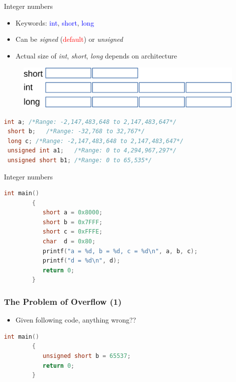 \begin{frame}[fragile]{Integer numbers}
	\vspace{-0.2in}
	\begin{itemize}
		\item Keywords: \textcolor{blue}{int}, \textcolor{blue}{short}, \textcolor{blue}{long}
		\item Can be \textit{signed} (\textcolor{red}{default}) or \textit{unsigned}
		\item Actual size of \textit{int}, \textit{short}, \textit{long} depends on architecture
	\end{itemize}
	\begin{figure}
		\includegraphics[width=0.65\linewidth]{figs/ints.pdf}
	\end{figure}
	\vspace{-0.1in}
	\begin{center}
	\begin{lstlisting}[language=c,frame=none, linewidth=0.9\linewidth]
 int a;	/*Range: -2,147,483,648 to 2,147,483,647*/
 short b;	/*Range: -32,768 to 32,767*/
 long c; /*Range: -2,147,483,648 to 2,147,483,647*/
 unsigned int a1;	/*Range: 0 to 4,294,967,297*/		
 unsigned short b1;	/*Range: 0 to 65,535*/
	\end{lstlisting}
	\end{center}	
\end{frame}


\begin{frame}[fragile]{Integer numbers}
	\begin{center}
		\begin{lstlisting}[numbers=none, frame=none, language=c]
	    int main()
	    {
	       short a = 0x8000;
	       short b = 0x7FFF;
	       short c = 0xFFFE;
	       char  d = 0x80;
	       printf("a = %d, b = %d, c = %d\n", a, b, c);
	       printf("d = %d\n", d);
	       return 0;
	    }
	\end{lstlisting}
	\end{center}	
\end{frame}

\begin{frame}[fragile]
	\frametitle{The Problem of Overflow (1)}
\begin{itemize}
	\item {Given following code, anything wrong??}
\end{itemize}
		\begin{lstlisting}[numbers=none, frame=none, language=c]
	    int main()
	    {
	       unsigned short b = 65537;
	       return 0;
	    }
	\end{lstlisting}
\end{frame}

